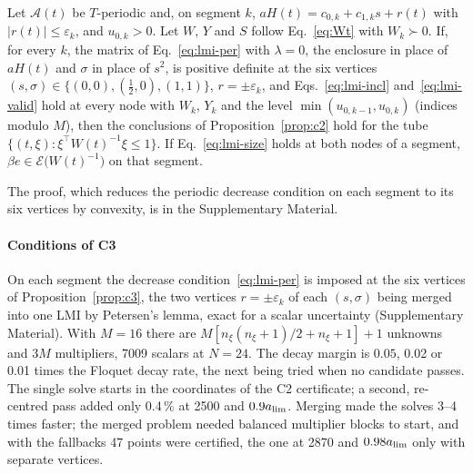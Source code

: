 \begin{proposition}\label{prop:c3}
Let $\mathcal A(t)$ be $T$-periodic and, on segment $k$, $aH(t)=c_{0,k}+c_{1,k}s+r(t)$ with $\lvert r(t)\rvert\le\varepsilon_k$, and $u_{0,k}>0$. Let $W$, $Y$ and $S$ follow Eq.~\eqref{eq:Wt} with $W_k\succ0$. If, for every $k$, the matrix of Eq.~\eqref{eq:lmi-per} with $\lambda=0$, the enclosure in place of $aH(t)$ and $\sigma$ in place of $s^2$, is positive definite at the six vertices $(s,\sigma)\in\{(0,0),(\tfrac12,0),(1,1)\}$, $r=\pm\varepsilon_k$, and Eqs.~\eqref{eq:lmi-incl} and~\eqref{eq:lmi-valid} hold at every node with $W_k$, $Y_k$ and the level $\min(u_{0,k-1},u_{0,k})$ (indices modulo $M$), then the conclusions of Proposition~\ref{prop:c2} hold for the tube $\{(t,\xi):\xi^\top W(t)^{-1}\xi\le1\}$. If Eq.~\eqref{eq:lmi-size} holds at both nodes of a segment, $\beta e\in\mathcal E\big(W(t)^{-1}\big)$ on that segment.
\end{proposition}
The proof, which reduces the periodic decrease condition on each segment to its six vertices by convexity, is in the Supplementary Material.

\paragraph{Conditions of C3}
On each segment the decrease condition~\eqref{eq:lmi-per} is imposed at the six vertices of Proposition~\ref{prop:c3}, the two vertices $r=\pm\varepsilon_k$ of each $(s,\sigma)$ being merged into one LMI by Petersen's lemma, exact for a scalar uncertainty \citep{petersen1987stabilization} (Supplementary Material). With $M=16$ there are $M[n_\xi(n_\xi+1)/2+n_\xi+1]+1$ unknowns and $3M$ multipliers, 7009 scalars at $N=24$. The decay margin is $0.05$, 0.02 or 0.01 times the Floquet decay rate, the next being tried when no candidate passes. The single solve starts in the coordinates of the C2 certificate; a second, re-centred pass added only 0.4\,\% at \SI{2500}{\rpm} and $0.9a_{\lim}$. Merging made the solves 3--4 times faster; the merged problem needed balanced multiplier blocks to start, and with the fallbacks 47 points were certified, the one at \SI{2870}{\rpm} and $0.98a_{\lim}$ only with separate vertices.

